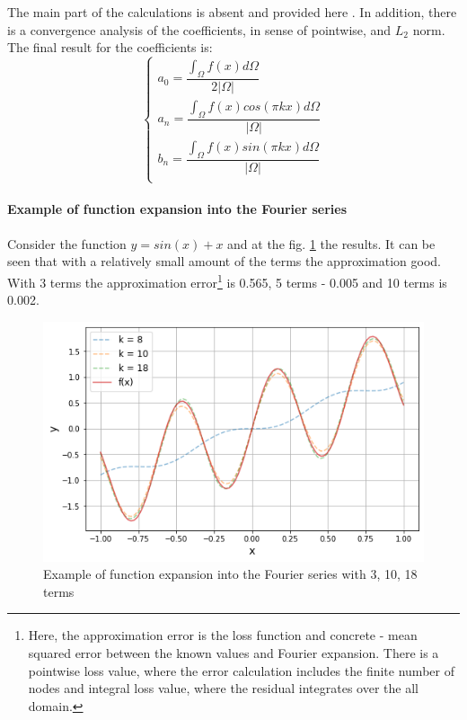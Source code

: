 The main part of the calculations is absent and provided here \cite{fourierintro}. In addition, there is a convergence analysis of the coefficients, in sense of pointwise, and $L_2$ norm. The final result for the coefficients is:
\begin{equation}
	\begin{cases}
		a_0 = \dfrac{{\displaystyle \int_{\Omega}} f(x) d\Omega }{2 | \Omega |} \\[20pt]
		a_n = \dfrac{{\displaystyle \int_{\Omega}} f(x) cos(\pi k x) d\Omega}{| \Omega |} \\[20pt]
		b_n = \dfrac{{\displaystyle \int_{\Omega}} f(x) sin(\pi k x) d\Omega}{| \Omega |} \\[20pt]
	\end{cases}
\end{equation}

\paragraph{Example of function expansion into the Fourier series} 
Consider the function $y = sin(x) + x$ and at the fig. \ref{fig:fourier_demo} the results. It can be seen that with a relatively small amount of the terms the approximation good. With 3 terms the approximation error\footnote{Here, the approximation error is the loss function and concrete - mean squared error between the known values and Fourier expansion. There is a pointwise loss value, where the error calculation includes the finite number of nodes and integral loss value, where the residual integrates over the all domain.} is 0.565, 5 terms - 0.005 and 10 terms is 0.002.
\begin{figure}[h]
	\centering
	\includegraphics[width=\textwidth]{images/chapter2/fourier_demo.png}
	\caption{Example of function expansion into the Fourier series with 3, 10, 18 terms}
	\label{fig:fourier_demo}
\end{figure}

